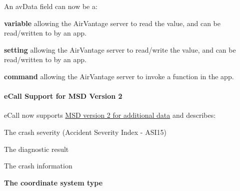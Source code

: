 An av\+Data field can now be a\+:
\begin{DoxyItemize}
\item {\bfseries variable} allowing the Air\+Vantage server to read the value, and can be read/written to by an app.
\item {\bfseries setting} allowing the Air\+Vantage server to read/write the value, and can be read/written to by an app.
\item {\bfseries command} allowing the Air\+Vantage server to invoke a function in the app.
\end{DoxyItemize}\hypertarget{releaseNotes18020_rn1802_Features_eCall}{}\paragraph{e\+Call Support for M\+S\+D Version 2}\label{releaseNotes18020_rn1802_Features_eCall}
e\+Call now supports \hyperlink{c_ecall_le_ecall_eraGlonassData}{M\+SD version 2 for additional data} and describes\+:
\begin{DoxyItemize}
\item The crash severity (Accident Severity Index -\/ A\+S\+I15)
\item The diagnostic result
\item The crash information
\item {\bfseries  The coordinate system type }
\end{DoxyItemize}

